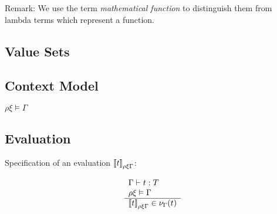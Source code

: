 Remark: We use the term \emph{mathematical function} to distinguish them from
lambda terms which represent a function.



\subsection{Value Sets}



\subsection{Context Model}

\begin{definition}
$\rho\xi \vDash \Gamma$
\end{definition}


\subsection{Evaluation}

Specification of an evaluation ${{{[\![} t {]\!]}}_{\rho\xi\Gamma}}$:

$$
\begin{array}{l} 
    \Gamma \vdash t : T
    \\
    \rho \xi \vDash \Gamma
 \\ \hline 
    {{{[\![}t {]\!]}}_{\rho\xi\Gamma}} \in {\nu_{\Gamma}(t)}
\end{array}
$$

